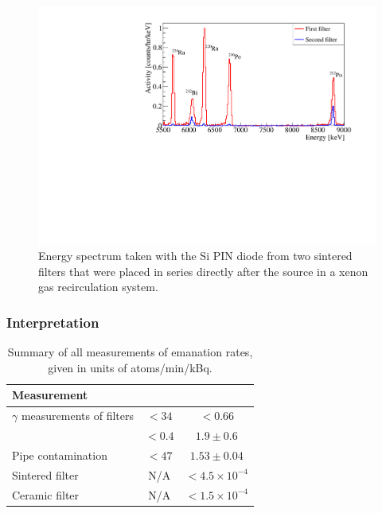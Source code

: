 \documentclass[phys,dissertation]{puthesis}
\begin{document}
\begin{figure}[htb]
\centering
\includegraphics[trim = 5 0 40 20, clip = true,width = 0.8\columnwidth]{figures/chapter_five/twofilters.pdf}
\caption{Energy spectrum taken with the Si PIN diode from two sintered filters that were placed in series directly after the source in a xenon gas recirculation system.}
\label{fig:twofilters}
\end{figure}

\subsubsection{Interpretation}

\begin{table}[htb]
\centering
	\caption{Summary of all measurements of emanation rates, given in units of atoms/min/kBq.}
	\label{tab:summary}
	\begin{tabular}{|lcc|}
		\hline \hline
		Measurement & \Th & \Ra \\ \hline
		$\gamma$ measurements of filters  & $<34$ & $<0.66$ \\
		& $<0.4$ & $1.9\pm0.6$ \\
		Pipe contamination & $<47$ & $1.53\pm0.04$ \\
		Sintered filter & N/A & $<4.5\times10^{-4}$ \\
		Ceramic filter & N/A & $<1.5\times10^{-4}$ \\
		\hline \hline
	\end{tabular}
\end{table}
\end{document}
